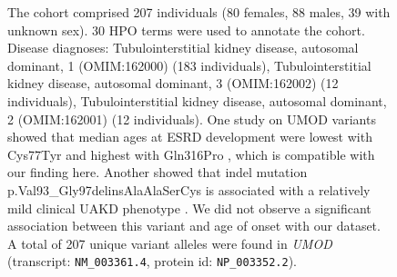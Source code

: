 \begin{figure}[htbp]
\caption{ The cohort comprised 207 individuals (80 females, 88 males, 39 with unknown sex). 30 HPO terms were used to annotate the cohort. 
Disease diagnoses: Tubulointerstitial kidney disease, autosomal dominant, 1 (OMIM:162000) (183 individuals), 
Tubulointerstitial kidney disease, autosomal dominant, 3 (OMIM:162002) (12 individuals), 
Tubulointerstitial kidney disease, autosomal dominant, 2 (OMIM:162001) (12 individuals). 
One study on UMOD variants showed that median ages at ESRD development were lowest with Cys77Tyr 
and highest with Gln316Pro \cite{PMID_23723338}, which is compatible with our finding here. Another showed that
indel mutation p.Val93\_Gly97delinsAlaAlaSerCys is associated with a relatively mild clinical UAKD phenotype \cite{PMID_22034507}. We did
not observe a significant association between this variant and age of onset with our dataset. 
A total of 207 unique variant alleles were found in \textit{UMOD} (transcript: \texttt{NM\_003361.4}, protein id: \texttt{NP\_003352.2}).}
\end{figure}
